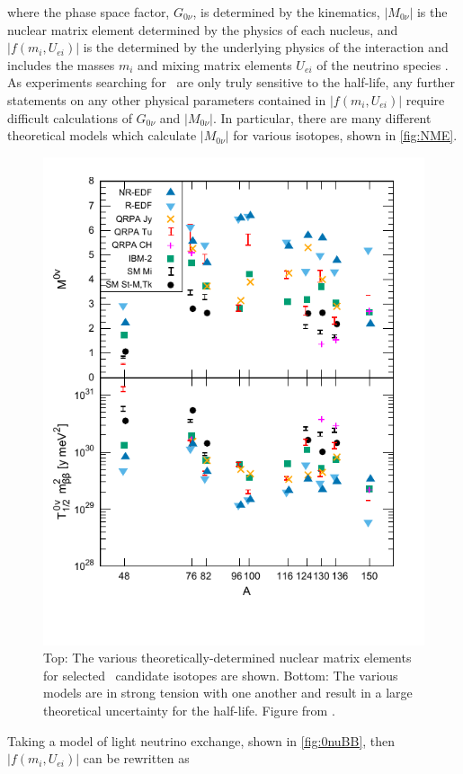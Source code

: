 where the phase space factor, $G_{0\nu}$, is determined by the kinematics, $|M_{0\nu}|$ is the nuclear matrix element determined by the physics of each nucleus, and $|f(m_i, U_{ei})|$ is the determined by the underlying physics of the interaction and includes the masses $m_i$ and mixing matrix elements $U_{ei}$ of the neutrino species \cite{Barea:2013bz}.
As experiments searching for \zeronubb~are only truly sensitive to the half-life, any further statements on any other physical parameters contained in $|f(m_i, U_{ei})|$ require difficult calculations of $G_{0\nu}$ and $|M_{0\nu}|$.
In particular, there are many different theoretical models which calculate $|M_{0\nu}|$ for various isotopes, shown in \autoref{fig:NME}.
\begin{figure}[htbp]
    \centering
    \includegraphics[width=0.8\linewidth]{Figures/NMEversusA.pdf}
    \caption[The various theoretically-determined nuclear matrix elements for selected \zeronubb~candidate isotopes.]
    {Top: The various theoretically-determined nuclear matrix elements for selected \zeronubb~candidate isotopes are shown.
    Bottom: The various models are in strong tension with one another and result in a large theoretical uncertainty for the half-life. Figure from \cite{Engel:NME}.}
    \label{fig:NME}
\end{figure}
Taking a model of light neutrino exchange, shown in \autoref{fig:0nuBB}, then $|f(m_i, U_{ei})|$ can be rewritten as
